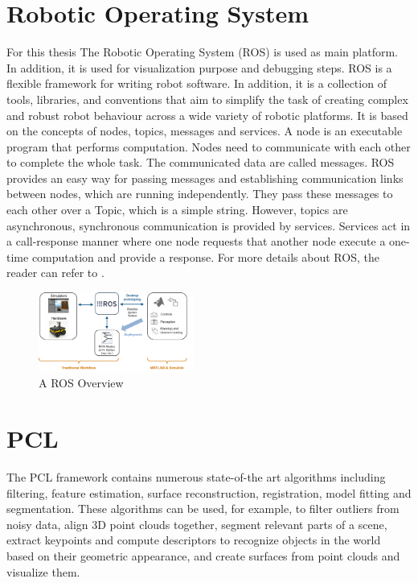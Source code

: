 \section{Robotic Operating System}

For this thesis The Robotic Operating System (ROS) is used as main platform. In addition, it is used for visualization purpose and debugging steps. ROS is a flexible framework for writing robot software. In addition, it is  a collection of tools, libraries, and conventions that aim to simplify the task of creating complex and robust robot behaviour across a wide variety of robotic platforms. It is based on the concepts of nodes, topics, messages and services. A node is an executable program that performs computation. Nodes need to communicate with each other to complete the whole task. The communicated data are called messages. ROS provides an easy way for passing messages and establishing communication links between nodes, which are running independently. They pass these messages to each other over a Topic, which is a simple string. However, topics are asynchronous, synchronous communication is provided by services. Services act in a call-response manner where one node requests that another node execute a one-time computation and provide a response. For more details about ROS, the reader can refer to \cite{ros}.

\begin{figure}[!h]
\begin{center}
\includegraphics[width=2in]{figures02/ros_workflows.png}
\caption{A ROS Overview}%
\end{center}
\end{figure}


\section{PCL}

The PCL\cite{pcl} framework contains numerous state-of-the art algorithms including filtering, feature estimation, surface reconstruction, registration, model fitting and segmentation. These algorithms can be used, for example, to filter outliers from noisy data, align 3D point clouds together, segment relevant parts of a scene, extract keypoints and compute descriptors to recognize objects in the world based on their geometric appearance, and create surfaces from point clouds and visualize them. 

